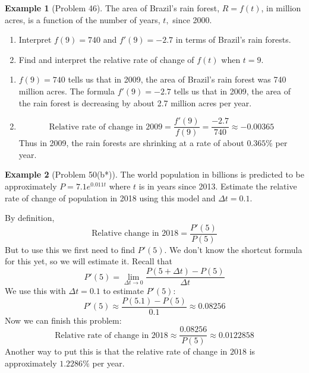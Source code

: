 \documentclass[oneside]{book}
\theoremstyle{definition}
\newtheorem{example}{Example}
\theoremstyle{solution}
\newtheorem*{solution}{Solution}
\newenvironment{solution}{\vspace{2in}\comment}{\endcomment}
\begin{document}
\begin{example}[Problem 46]
The area of Brazil's rain forest, $R = f(t)$, in million acres, is a
function of the number of years, $t,$ since 2000.
\begin{enumerate}
\item Interpret $f(9) = 740$ and $f'(9) = -2.7$ in terms of Brazil's
  rain forests.
\item Find and interpret the relative rate of change of $f(t)$ when
  $t = 9$.
\end{enumerate}
\end{example}

\begin{solution}
\begin{enumerate}
\item $f(9) = 740$ tells us that in 2009, the area of Brazil's rain
  forest was 740 million acres.  The formula $f'(9) = -2.7$ tells us
  that in 2009, the area of the rain forest is decreasing by about 2.7
  million acres per year.

\item  
$$
\text{Relative rate of change in 2009} = \frac{f'(9)}{f(9)} =
    \frac{-2.7}{740} \approx -0.00365
$$
Thus in 2009, the rain forests are shrinking at a rate of about
$0.365\%$ per year.
\end{enumerate}
\end{solution}


\begin{example}[Problem 50(b*)]
The world population in billions is predicted to be approximately
$P = 7.1e^{0.011t}$ where $t$ is in years since 2013. Estimate the
relative rate of change of population in 2018 using this model and
$\Delta t = 0.1$.
\end{example}

\begin{solution}
By definition, 
$$
\text{Relative change in 2018} = \frac{P'(5)}{P(5)}
$$
But to use this we first need to find $P'(5)$.  We don't know the
shortcut formula for this yet, so we will estimate it.  Recall  that
$$
P'(5) = \lim_{\Delta t \to 0} \frac{P(5 + \Delta t) - P(5)}{\Delta t}
$$
We use this with $\Delta t=0.1$ to estimate $P'(5)$:
$$
  P'(5) \approx \frac{P(5.1) - P(5)}{0.1} \approx 0.08256
$$
Now we can finish this problem:
$$
\text{Relative rate of change in 2018} \approx \frac{0.08256}{P(5)}
\approx 0.0122858
$$
Another way to put this is that the relative rate of change in $2018$
is approximately $1.2286 \%$ per year.
\end{solution}
\end{document}
